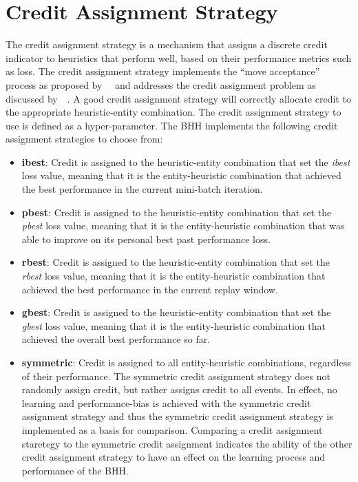 \section{Credit Assignment Strategy}
\label{sec:bhh:credit_assignment_strategy}

The credit assignment strategy is a mechanism that assigns a discrete credit indicator to heuristics that perform well, based on their performance metrics such as loss. The credit assignment strategy implements the ``move acceptance'' process as proposed by~\citeauthor{ref:ozcan:2006}~\cite{ref:ozcan:2006,ref:ozcan:2008} and addresses the credit assignment problem as discussed by~\citeauthor{ref:burke:2010}~\cite{ref:burke:2010}. A good credit assignment strategy will correctly allocate credit to the appropriate heuristic-entity combination. The credit assignment strategy to use is defined as a hyper-parameter. The \acs{BHH} implements the following credit assignment strategies to choose from:

\begin{itemize}
      \item \textbf{ibest}: Credit is assigned to the heuristic-entity combination that set the \textit{ibest} loss value, meaning that it is the entity-heuristic combination that achieved the best performance in the current mini-batch iteration.

      \item \textbf{pbest}: Credit is assigned to the heuristic-entity combination that set the \textit{pbest} loss value, meaning that it is the entity-heuristic combination that was able to improve on its personal best past performance loss.

      \item \textbf{rbest}: Credit is assigned to the heuristic-entity combination that set the \textit{rbest} loss value, meaning that it is the entity-heuristic combination that achieved the best performance in the current replay window.

      \item \textbf{gbest}: Credit is assigned to the heuristic-entity combination that set the \textit{gbest} loss value, meaning that it is the entity-heuristic combination that achieved the overall best performance so far.

      \item \textbf{symmetric}: Credit is assigned to all entity-heuristic combinations, regardless of their performance. The symmetric credit assignment strategy does not randomly assign credit, but rather assigns credit to all events. In effect, no learning and performance-bias is achieved with the symmetric credit assignment strategy and thus the symmetric credit assignment strategy is implemented as a basis for comparison. Comparing a credit assignment staretegy to the symmetric credit assignment indicates the ability of the other credit assignment strategy to have an effect on the learning process and performance of the \acs{BHH}.
\end{itemize}

